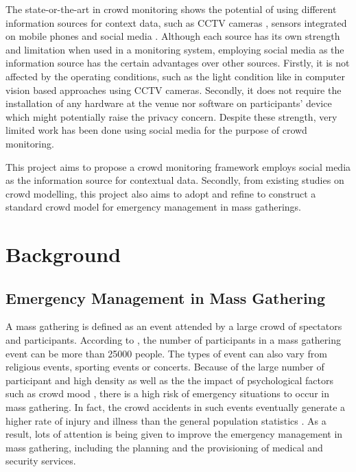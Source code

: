 The state-or-the-art in crowd monitoring shows the potential of using different information sources for context data, such as CCTV cameras \citep{Davies1995}, sensors integrated on mobile phones \citep{Wirz2013} and social media \citep{DelirHaghighi2013}. Although each source has its own strength and limitation when used in a monitoring system, employing social media as the information source has the certain advantages over other sources. Firstly, it is not affected by the operating conditions, such as the light condition like in computer vision based approaches using CCTV cameras. Secondly, it does not require the installation of any hardware at the venue nor software on participants' device which might potentially raise the privacy concern. Despite these strength, very limited work has been done using social media for the purpose of crowd monitoring.

This project aims to propose a crowd monitoring framework employs social media as the information source for contextual data. Secondly, from existing studies on crowd modelling, this project also aims to adopt and refine to construct a standard crowd model for emergency management in mass gatherings.

\section{Background}

\subsection{Emergency Management in Mass Gathering}

A mass gathering is defined as an event attended by a large crowd of spectators and participants. According to \citep{Arbon2007}, the number of participants in a mass gathering event can be more than 25000 people. The types of event can also vary from religious events, sporting events or concerts. Because of the large number of participant and high density as well as the the impact of psychological factors such as crowd mood \citep{Arbon2004}, there is a high risk of emergency situations to occur in mass gathering. In fact, the crowd accidents in such events eventually generate a higher rate of injury and illness than the general population statistics \citep{Arbon2007}. As a result, lots of attention is being given to improve the emergency management in mass gathering, including the planning and the provisioning of medical and security services. 

